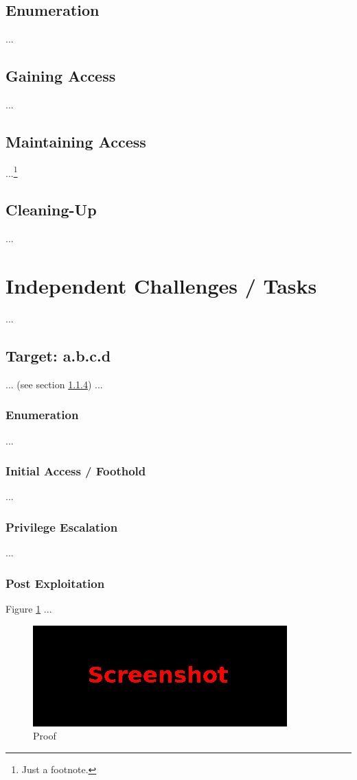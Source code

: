 \subsection{Enumeration}\label{oscp-sec:sec3-enum}
%
...
%
%
%
\subsection{Gaining Access}\label{oscp-sec:sec3-gain}
%
...
%
%
%
\subsection{Maintaining Access}\label{oscp-sec:sec3-main}
%
...\footnote{Just a footnote.}
%
%
%
\subsection{Cleaning-Up}\label{oscp-sec:sec3-clean}
%
...
%
%
%
\section{Independent Challenges / Tasks}\label{oscp-sec:sec4}
%
...
%
%
%
\subsection{Target: a.b.c.d}\label{oscp-sec:sec4-target1}
%
... (see section \ref{oscp-sec:sec4-target1-post}) ...
%
%
%
\subsubsection{Enumeration}\label{oscp-sec:sec4-target1-enum}
%
...
%
%
%
\subsubsection{Initial Access / Foothold}\label{oscp-sec:sec4-target1-init}
%
...
%
%
%
\subsubsection{Privilege Escalation}\label{oscp-sec:sec4-target1-priv}
%
...
%
%
%
\subsubsection{Post Exploitation}\label{oscp-sec:sec4-target1-post}
%
Figure \ref{oscp-fig:sec4-target1-proof} ...

\begin{figure}[H]
    \centering
    \includegraphics[width=\textwidth]{img/assignment1/screen1.png}
    \caption{Proof}\label{oscp-fig:sec4-target1-proof}
\end{figure}
%
%
%
